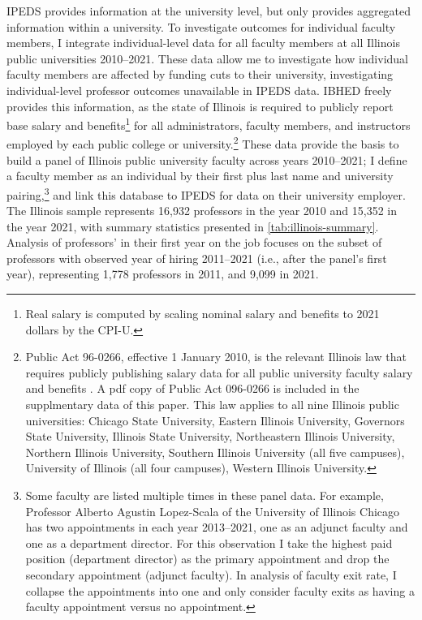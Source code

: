 IPEDS provides information at the university level, but only provides aggregated information within a university.
To investigate outcomes for individual faculty members, I integrate individual-level data for all faculty members at all Illinois public universities 2010--2021.
These data allow me to investigate how individual faculty members are affected by funding cuts to their university, investigating individual-level professor outcomes unavailable in IPEDS data.
IBHED freely provides this information, as the state of Illinois is required to publicly report base salary and benefits\footnote{
    Real salary is computed by scaling nominal salary and benefits to 2021 dollars by the CPI-U.
} for all administrators, faculty members, and instructors employed by each public college or university.\footnote{
    Public Act 96-0266, effective 1 January 2010, is the relevant Illinois law that requires publicly publishing salary data for all public university faculty salary and benefits \citep{illinois-public-act}.
    A pdf copy of Public Act 096-0266 is included in the supplmentary data of this paper.
    This law applies to all nine Illinois public universities: Chicago State University, Eastern Illinois University, Governors State University, Illinois State University, Northeastern Illinois University, Northern Illinois University, Southern Illinois University (all five campuses), University of Illinois (all four campuses), Western Illinois University.
}
These data provide the basis to build a panel of Illinois public university faculty across years 2010--2021; I define a faculty member as an individual by their first plus last name and university pairing,\footnote{
    Some faculty are listed multiple times in these panel data.
    For example, Professor Alberto Agustin Lopez-Scala of the University of Illinois Chicago has two appointments in each year 2013--2021, one as an adjunct faculty and one as a department director.
    For this observation I take the highest paid position (department director) as the primary appointment and drop the secondary appointment (adjunct faculty).
    In analysis of faculty exit rate, I collapse the appointments into one and only consider faculty exits as having a faculty appointment versus no appointment.
}
and link this database to IPEDS for data on their university employer.
The Illinois sample represents 16,932 professors in the year 2010 and 15,352 in the year 2021, with summary statistics presented in \autoref{tab:illinois-summary}.
Analysis of professors' in their first year on the job focuses on the subset of professors with observed year of hiring 2011--2021 (i.e., after the panel's first year), representing 1,778 professors in 2011, and 9,099 in 2021.

